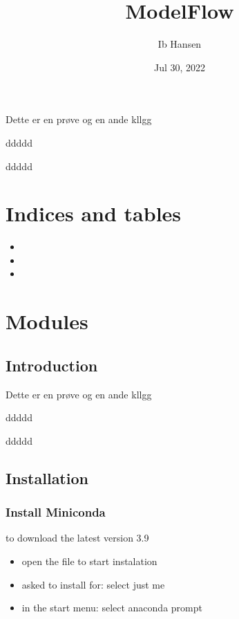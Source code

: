 \documentclass[letterpaper,10pt,english]{sphinxmanual}
\title{ModelFlow}
\date{Jul 30, 2022}
\author{Ib Hansen}
\begin{document}
\pagestyle{empty}
\sphinxmaketitle
\pagestyle{plain}
\sphinxtableofcontents
\pagestyle{normal}
\label{\detokenize{index::doc}}


\sphinxAtStartPar
Dette er en prøve
og en ande kllgg

\sphinxAtStartPar
ddddd

\sphinxAtStartPar
ddddd


\chapter{Indices and tables}
\label{\detokenize{index:indices-and-tables}}\begin{itemize}
\item {} 
\sphinxAtStartPar
{}

\item {} 
\sphinxAtStartPar
{}

\item {} 
\sphinxAtStartPar
{}

\end{itemize}


\chapter{Modules}
\label{\detokenize{index:modules}}
\sphinxstepscope


\section{Introduction}
\label{\detokenize{Introduction:introduction}}\label{\detokenize{Introduction::doc}}
\sphinxAtStartPar
Dette er en prøve
og en ande kllgg

\sphinxAtStartPar
ddddd

\sphinxAtStartPar
ddddd

\sphinxstepscope


\section{Installation}
\label{\detokenize{Installation:installation}}\label{\detokenize{Installation::doc}}

\subsection{Install Miniconda}
\label{\detokenize{Installation:install-miniconda}}
\sphinxAtStartPar
{} to download the latest version 3.9
\begin{itemize}
\item {} 
\sphinxAtStartPar
open the file to start instalation

\item {} 
\sphinxAtStartPar
asked to install for: select just me

\item {} 
\sphinxAtStartPar
in the start menu: select anaconda prompt

\end{itemize}
\end{document}
